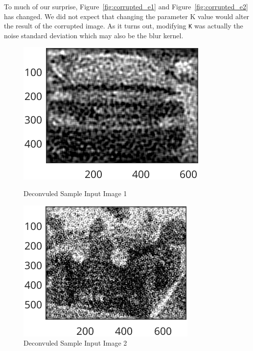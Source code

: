 \documentclass{article}
\begin{document}
\begin{itemize}
			To much of our surprise, {Figure~\ref{fig:corrupted_e1}} and {Figure~\ref{fig:corrupted_e2}} has changed. We did not expect that changing the parameter K value would alter the result of
			the corrupted image. As it turns out, modifying {\texttt{K}} was actually the noise standard deviation which may also be the blur kernel.

  		\begin{figure}[ht]
  			\centering
  			\begin{minipage}[t]{0.45\textwidth}
    			\centering
    			\includegraphics[width=\textwidth]{2AE1K0.9}
    			\caption{Deconvuled Sample Input Image 1}
    			\label{fig:deconv_e1_2}
  			\end{minipage}\hfill
  			\begin{minipage}[t]{0.45\textwidth}
    			\centering
    			\includegraphics[width=\textwidth]{2AE2K0.9}
    			\caption{Deconvuled Sample Input Image 2}
    			\label{fig:deconv_e2_2}
  			\end{minipage}
			\end{figure}


\end{itemize}
\end{document}

